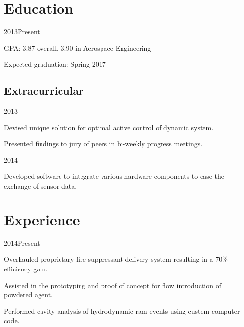 \documentclass[letterpaper,10pt]{resume}
\author{Nicklas O. Stockton}
\begin{document}
\maketitle
\section{Education}
			{2013\textendash Present}

	\begin{compactitem}
	\item GPA: 3.87 overall, 3.90 in Aerospace Engineering
	\item Expected graduation: Spring 2017
	\end{compactitem}
	\subsection{Extracurricular}
				{2013}
		\begin{compactitem}
		\item Devised unique solution for optimal active control of dynamic system.
		\item Presented findings to jury of peers in bi-weekly progress meetings.
		\end{compactitem}
				
				{2014}
		\begin{compactitem}
		\item Developed software to integrate various hardware components to ease the exchange of sensor data. 
		\end{compactitem}
				
	
\section{Experience}
			{2014\textendash Present}
	\begin{compactitem}
	\item Overhauled proprietary fire suppressant delivery system resulting in a 70\% efficiency gain.
	\item Assisted in the prototyping and proof of concept for flow introduction of powdered agent. 
	\item Performed cavity analysis of hydrodynamic ram events using custom computer code.
	\end{compactitem}
	
\end{document}
